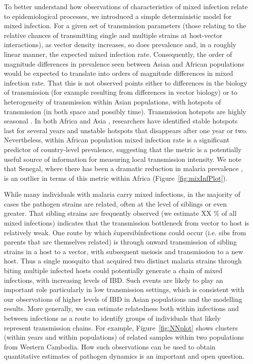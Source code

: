 \documentclass[9pt,lineno]{elife}
\begin{document}
To better understand how observations of characteristics of mixed infection relate to epidemiological processes, we introduced a simple deterministic model for mixed infection.  For a given set of transmission parameters (those relating to the relative chances of transmitting single and multiple strains at host-vector interactions), as vector density increases, so does prevalence and, in a roughly linear manner, the expected mixed infection rate.  Consequently, the order of magnitude differences in prevalence seen between Asian and African populations would be expected to translate into orders of magnitude differences in mixed infection rate. That this is not observed points either to differences in the biology of transmission (for example resulting from differences in vector biology) or to heterogeneity of transmission within Asian populations, with hotspots of transmission (in both space and possibly time). Transmission hotspots are highly seasonal \citep{Ahmed2013}. In both Africa \citep{Bejon2010} and Asia \citep{Heng2017}, researchers have identified stable hotspots last for several years and unstable hotspots that disappears after one year or two. Nevertheless, within African population mixed infection rate is a significant predictor of country-level prevalence, suggesting that the metric is a potentially useful source of information for measuring local transmission intensity.  We note that Senegal, where there has been a dramatic reduction in malaria prevalence \citep{Daniels2015}, is an outlier in terms of this metric within Africa (Figure~\ref{fig:mixInfPlot}).

While many individuals with malaria carry mixed infections, in the majority of cases the pathogen strains are related, often at the level of siblings or even greater.  That sibling strains are frequently observed (we estimate XX \% of all mixed infections) indicates that the transmission bottleneck from vector to host is relatively weak.  One route by which \'supersib\' infections could occur (i.e. sibs from parents that are themselves related) is through onward transmission of sibling strains in a host to a vector, with subsequent meiosis and transmission to a new host. Thus a single mosquito that acquired two distinct malaria strains through biting multiple infected hosts could potentially generate a chain of mixed infections, with increasing levels of IBD.  Such events are likely to play an important role particularly in low transmission settings, which is consistent with our observations of higher levels of IBD in Asian populations and the modelling results.  More generally, we can estimate relatedness both within infections and between infections as a route to identify groups of individuals that likely represent transmission chains.  For example, Figure~\ref{fig:NNplot} shows clusters (within years and within populations) of related samples within two populations from Western Cambodia.  How such observations can be used to obtain quantitative estimates of pathogen dynamics is an important and open question.
\end{document}
